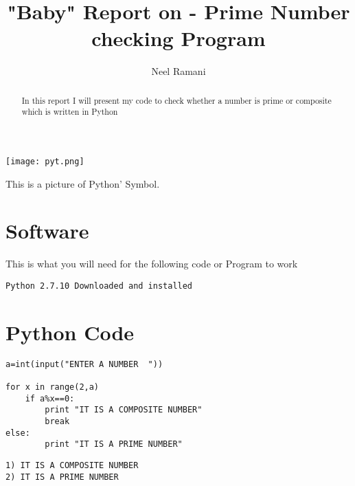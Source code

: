 \documentclass{tufte-handout}
\title{"Baby" Report on - Prime Number checking Program}
\author[EF Academy]{Neel Ramani}
\begin{document}
\maketitle%
\begin{marginfigure}%
  \texttt{[image: pyt.png]}
  \caption{This is a picture of Python' Symbol.}
  \label{fig:marginfig}
\end{marginfigure}
\begin{abstract}
\noindent
In this report I will present my code to check whether a number is prime or composite which is written in Python
\end{abstract}

\normalsize

\vspace{1cm}
\section{Software}

This is what you will need for the following code or Program to work

\begin{shaded}
\begin{verbatim}
Python 2.7.10 Downloaded and installed
\end{verbatim}
\end{shaded}

\vspace{1cm}

\section{Python Code}


\begin{framed}
\begin{verbatim}
a=int(input("ENTER A NUMBER  "))

for x in range(2,a)
    if a%x==0:
        print "IT IS A COMPOSITE NUMBER"
        break
else:
        print "IT IS A PRIME NUMBER"
\end{verbatim}
\end{framed}


\begin{shaded}
\begin{verbatim}
1) IT IS A COMPOSITE NUMBER
2) IT IS A PRIME NUMBER
\end{verbatim}
\end{shaded}



\end{document}
